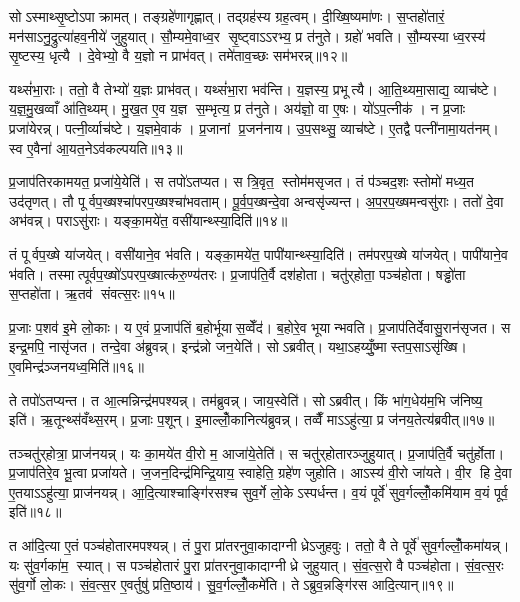 सोऽस्माथ्सृ॒ष्टोऽपाक्रामत्। तङ्ग्रहे॑णागृह्णात्। तद्ग्रह॑स्य ग्रह॒त्वम्। दी॒ख्षि॒ष्यमा॑णः। स॒प्तहो॑तारं॒ मन॑साऽनु॒द्रुत्या॑हव॒नीये॑ जुहुयात्। सौ॒म्यमे॒वाध्व॒र सृ॒ष्ट्वाऽऽरभ्य॒ प्र त॑नुते। ग्रहो॑ भवति। सौ॒म्यस्याध्व॒रस्य॑ सृ॒ष्टस्य॒ धृत्यै। दे॒वेभ्यो॒ वै य॒ज्ञो न प्राभ॑वत्। तमे॑ताव॒च्छः सम॑भरन्न्॥१२॥

यथ्सं॑भा॒राः। ततो॒ वै तेभ्यो॑ य॒ज्ञः प्राभ॑वत्। यथ्सं॑भा॒रा भव॑न्ति। य॒ज्ञस्य॒ प्रभूत्यै। आ॒ति॒थ्यमा॒साद्य॒ व्याच॑ष्टे। य॒ज्ञ॒मु॒खव्वाँ आ॑ति॒थ्यम्। मु॒ख॒त ए॒व य॒ज्ञ स॒म्भृत्य॒ प्र त॑नुते। अय॑ज्ञो॒ वा ए॒षः। यो॑ऽप॒त्नीक॑। न प्र॒जाः प्रजा॑येरन्न्। पत्नी॒र्व्याच॑ष्टे। य॒ज्ञमे॒वाक॑। प्र॒जानां प्र॒जन॑नाय। उ॒प॒सथ्सु॒ व्याच॑ष्टे। ए॒तद्वै पत्नी॑नामा॒यत॑नम्। स्व ए॒वैना॑ आ॒यत॒नेऽव॑कल्पयति॥१३॥\anuvakamend[त॒नु॒त॒ आ॒लभ॑मानोऽगृह्णादसृजताभरञ्जायेर॒न्थ्षट्च॑]

प्र॒जाप॑तिरकामयत॒ प्रजा॑ये॒येति॑। स तपो॑ऽतप्यत। स त्रि॒वृत॒ स्तोम॑मसृजत। तं प॑ञ्चद॒शः स्तोमो॑ मध्य॒त उद॑तृणत्। तौ पूर्वप॒ख्षश्चा॑परप॒ख्षश्चा॑भवताम्। पू॒र्व॒प॒ख्षन्दे॒वा अन्वसृ॑ज्यन्त। अ॒प॒र॒प॒ख्षमन्वसु॑राः। ततो॑ दे॒वा अभ॑वन्न्। पराऽसु॑राः। यङ्का॒मये॑त॒ वसी॑यान्थ्स्या॒दिति॑॥१४॥

तं पूर्वप॒ख्षे या॑जयेत्। वसी॑याने॒व भ॑वति। यङ्का॒मये॑त॒ पापी॑यान्थ्स्या॒दिति॑। तम॑परप॒ख्षे या॑जयेत्। पापी॑याने॒व भ॑वति। तस्मात्पूर्वप॒ख्षो॑ऽपरप॒ख्षात्क॑रु॒ण्य॑तरः। प्र॒जाप॑ति॒र्वै दश॑होता। चतु॑र्‌होता॒ पञ्च॑होता। षड्ढो॑ता स॒प्तहो॑ता। ऋ॒तव॑ संवत्स॒रः॥१५॥

प्र॒जाः प॒शव॑ इ॒मे लो॒काः। य ए॒वं प्र॒जाप॑तिं ब॒होर्भूयास॒व्वेँद॑। ब॒होरे॒व भूयान्भवति। प्र॒जाप॑तिर्देवासु॒रान॑सृजत। स इन्द्र॒मपि॒ नासृ॑जत। तन्दे॒वा अ॑ब्रुवन्न्। इन्द्र॑न्नो जन॒येति॑। सोऽब्रवीत्। यथा॒ऽहय्युँ॒ष्मास्तप॒साऽसृ॑ख्षि। ए॒वमिन्द्र॑ञ्जनयध्व॒मिति॑॥१६॥

ते तपो॑ऽतप्यन्त। त आ॒त्मन्निन्द्र॑मपश्यन्न्। तम॑ब्रुवन्न्। जाय॒स्वेति॑। सोऽब्रवीत्। किं भा॑ग॒धेय॑म॒भि ज॑निष्य॒ इति॑। ऋ॒तून्थ्स॑वँथ्स॒रम्। प्र॒जाः प॒शून्। इ॒माल्लोँ॒कानित्य॑ब्रुवन्न्। तव्वैँ माऽऽहु॑त्या॒ प्र ज॑नय॒तेत्य॑ब्रवीत्॥१७॥

तञ्चतु॑र्‌होत्रा॒ प्राज॑नयन्न्। यः का॒मये॑त वी॒रो म॒ आजा॑ये॒तेति॑। स चतु॑र्‌होतारञ्जुहुयात्। प्र॒जाप॑ति॒र्वै चतु॑र्होता। प्र॒जाप॑तिरे॒व भू॒त्वा प्रजा॑यते। ज॒जन॒दिन्द्र॑मिन्द्रि॒याय॒ स्वाहेति॒ ग्रहे॑ण जुहोति। आऽस्य॑ वी॒रो जा॑यते। वी॒र हि दे॒वा ए॒तयाऽऽहु॑त्या॒ प्राज॑नयन्न्। आ॒दि॒त्याश्चाङ्गि॑रसश्च सुव॒र्गे लो॒केऽस्पर्धन्त। व॒यं पूर्वे॑ सुव॒र्गल्लोँ॒कमि॑याम व॒यं पूर्व॒ इति॑॥१८॥

त आ॑दि॒त्या ए॒तं पञ्च॑होतारमपश्यन्न्। तं पु॒रा प्रा॑तरनुवा॒कादाग्नीध्रेऽजुहवुः। ततो॒ वै ते पूर्वे॑ सुव॒र्गल्लोँ॒कमा॑यन्न्। यः सु॑व॒र्गका॑म॒ स्यात्। स पञ्च॑होतारं पु॒रा प्रा॑तरनुवा॒कादाग्नीध्रे जुहुयात्। सं॒व॒त्स॒रो वै पञ्च॑होता। सं॒व॒त्स॒रः सु॑व॒र्गो लो॒कः। सं॒व॒त्स॒र ए॒वर्तुषु॑ प्रति॒ष्ठाय॑। सु॒व॒र्गल्लोँ॒कमे॑ति। तेऽब्रुव॒न्नङ्गि॑रस आदि॒त्यान्॥१९॥

